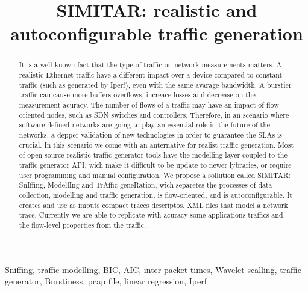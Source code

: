 \title{SIMITAR: realistic and autoconfigurable traffic generation}

\author{
\and
{}
}

\maketitle

\begin{abstract}
It is a well known fact that the type of traffic on network measurements matters. A realistic Ethernet traffic have a different impact over a device compared to constant traffic (such as generated by Iperf), even with the same avarage bandwidth. A burstier traffic can cause more buffers overflows, increace losses and decrease on the measurement acuracy. The number of flows of a traffic may have an impact of flow-oriented nodes, such as SDN switches and controllers. Therefore, in an scenario where software defined networks are going to play an essential role in the future of the networks, a depper validation of new technologies in order to guarantee the SLAs is crucial. In this scenario we come with an anternative for realist traffic generation. Most of open-source realistic traffic generator tools have the modelling layer coupled to the traffic generator API, wich make it difficult to be update to newer lybraries, or require user programming and manual configuration. We propose a sollution called SIMITAR: SnIffing, ModellIng and TrAffic geneRation, wich separetes the processes of data collection, modelling and traffic generation, is flow-oriented, and is autoconfigurable. It creates and use as imputs compact traces descriptos, XML files that model a network trace. Currently we are able to replicate with acuracy some applications traffics and the flow-level properties from the traffic.
\end{abstract}

\begin{IEEEkeywords}
Sniffing, traffic modelling, BIC, AIC, inter-packet times, Wavelet scalling, traffic generator, Burstiness, pcap file, linear regression, Iperf
\end{IEEEkeywords}
